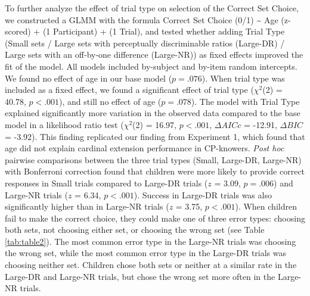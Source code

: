 \documentclass[
  man,floatsintext]{apa7}
\begin{document}
To further analyze the effect of trial type on selection of the Correct Set Choice, we constructed a GLMM with the formula Correct Set Choice (0/1) \textasciitilde{} Age (z-scored) + (1 \textbar{} Participant) + (1 \textbar{} Trial), and tested whether adding Trial Type (Small sets / Large sets with perceptually discriminable ratios (Large-DR) / Large sets with an off-by-one difference (Large-NR)) as fixed effects improved the fit of the model. All models included by-subject and by-item random intercepts. We found no effect of age in our base model (\(p = .076\)). When trial type was included as a fixed effect, we found a significant effect of trial type (\(\chi^2\)(2) = 40.78, \(p < .001\)), and still no effect of age (\(p = .078\)). The model with Trial Type explained significantly more variation in the observed data compared to the base model in a likelihood ratio test (\(\chi^2\)(2) = 16.97, \(p < .001\), \(\Delta AICc\) = -12.91, \(\Delta BIC\) = -3.92). This finding replicated our finding from Experiment 1, which found that age did not explain cardinal extension performance in CP-knowers. \emph{Post hoc} pairwise comparisons between the three trial types (Small, Large-DR, Large-NR) with Bonferroni correction found that children were more likely to provide correct responses in Small trials compared to Large-DR trials (\(z\) = 3.09, \(p = .006\)) and Large-NR trials (\(z\) = 6.34, \(p < .001\)). Success in Large-DR trials was also significantly higher than in Large-NR trials (\(z\) = 3.75, \(p < .001\)).
When children fail to make the correct choice, they could make one of three error types: choosing both sets, not choosing either set, or choosing the wrong set (see Table \ref{tab:table2}). The most common error type in the Large-NR trials was choosing the wrong set, while the most common error type in the Large-DR trials was choosing neither set. Children chose both sets or neither at a similar rate in the Large-DR and Large-NR trials, but chose the wrong set more often in the Large-NR trials.
\end{document}
